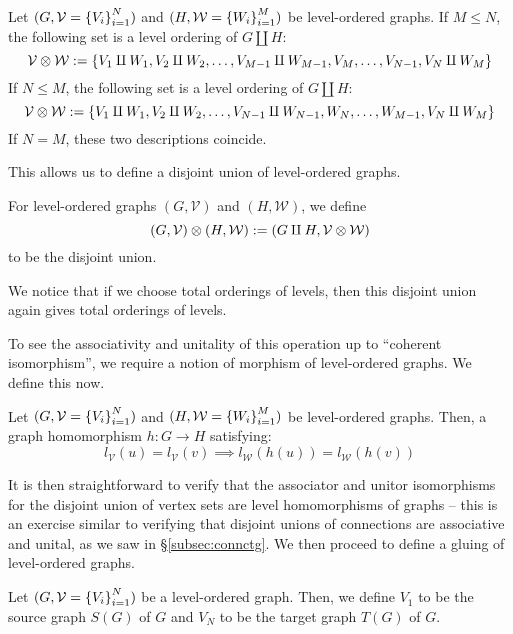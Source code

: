 \documentclass[./Thick_TQFTs_and_Quantum_Information.tex]{subfiles}
\begin{document}
\begin{cor}
Let $(G, \mathcal{V} = \set{V_i}_{i = 1}^{N})$ and
$(H, \mathcal{W} = \set{W_i}_{i = 1}^{M})$ be level-ordered
graphs. If $M \leq N$, the following set is a level ordering of $G \amalg H$:
\[
  \mathcal{V} \tensor \mathcal{W} :=
  \set{V_1 \amalg W_1, V_2 \amalg W_2, \dots, V_{M - 1} \amalg W_{M - 1},
  V_M, \dots, V_{N - 1}, V_N \amalg W_M}
\]
If $N \leq M$, the following set is a level ordering of $G \amalg H$:
\[
  \mathcal{V} \tensor \mathcal{W} :=
  \set{V_1 \amalg W_1, V_2 \amalg W_2, \dots, V_{N - 1} \amalg W_{N - 1},
  W_N, \dots, W_{M - 1}, V_N \amalg W_M}
\]
If $N = M$, these two descriptions coincide.
\end{cor}

This allows us to define a disjoint union of level-ordered graphs.
\begin{defn}
For level-ordered graphs $(G, \mathcal{V})$ and $(H, \mathcal{W})$, we define
\[
  (G, \mathcal{V}) \otimes (H, \mathcal{W}) :=
    (G \amalg H, \mathcal{V} \otimes \mathcal{W})
\]
to be the disjoint union.
\end{defn}

\begin{rmk}
We notice that if we choose total orderings of levels, then this disjoint union
again gives total orderings of levels.
\end{rmk}

To see the associativity and unitality of this operation up to ``coherent
isomorphism'', we require a notion of morphism of level-ordered graphs. We
define this now.

\begin{defn}
Let $(G, \mathcal{V} = \set{V_i}_{i = 1}^{N})$ and
$(H, \mathcal{W} = \set{W_i}_{i = 1}^{M})$ be level-ordered
graphs. Then, a graph homomorphism $h : G \to H$ satisfying:
\[
  l_{\mathcal{V}}(u) = l_{\mathcal{V}}(v)
  \implies l_{\mathcal{W}}(h(u)) = l_{\mathcal{W}}(h(v))
\]
\end{defn}

It is then straightforward to verify that the associator and unitor isomorphisms
for the disjoint union of vertex sets are level homomorphisms of graphs -- this
is an exercise similar to verifying that disjoint unions of connections are
associative and unital, as we saw in \S\ref{subsec:connctg}. We then proceed to
define a gluing of level-ordered graphs.

\begin{defn}
Let $(G, \mathcal{V} = \set{V_i}_{i = 1}^{N})$ be a level-ordered graph. Then,
we define $V_1$ to be the source graph $S(G)$ of $G$ and $V_N$ to be the target
graph $T(G)$ of $G$.
\end{defn}
\end{document}
